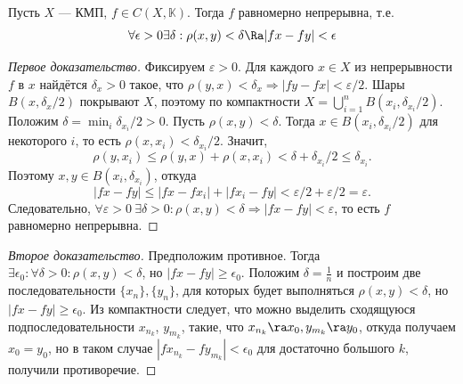 \begin{theorem}[Кантора]
    Пусть \(X\) --- КМП, \(f \in C(X, \mathbb{K})\). Тогда \(f\) равномерно непрерывна, т.е. 
    \[\forall \epsilon > 0 \exists \delta: \rho(x, y) < \delta \Ra |fx - fy| < \epsilon\]
\end{theorem}
\begin{proof}[Первое доказательство]
Фиксируем \(\varepsilon>0\). Для каждого \(x\in X\) из непрерывности \(f\) в \(x\) найдётся \(\delta_x>0\) такое, что \(\rho(y,x)<\delta_x\Rightarrow |fy-fx|<\varepsilon/2\). Шары \(B(x,\delta_x/2)\) покрывают \(X\), поэтому по компактности \(X=\bigcup_{i=1}^n B(x_i,\delta_{x_i}/2)\). Положим \(\delta=\min_i \delta_{x_i}/2>0\). Пусть \(\rho(x,y)<\delta\). Тогда \(x\in B(x_i,\delta_{x_i}/2)\) для некоторого \(i\), то есть \(\rho(x,x_i)<\delta_{x_i}/2\). Значит,
\[
\rho(y,x_i)\le \rho(y,x)+\rho(x,x_i)<\delta+\delta_{x_i}/2\le \delta_{x_i}.
\]
Поэтому \(x,y\in B(x_i,\delta_{x_i})\), откуда
\[
|fx-fy|\le |fx-fx_i|+|fx_i-fy|<\varepsilon/2+\varepsilon/2=\varepsilon.
\]
Следовательно, \(\forall\varepsilon>0\ \exists\delta>0:\rho(x,y)<\delta\Rightarrow |fx-fy|<\varepsilon\), то есть \(f\) равномерно непрерывна.
\end{proof}
\begin{proof}[Второе доказательство]
    Предположим противное. Тогда \(\exists \epsilon_0: \forall \delta > 0: \rho(x, y) < \delta\), но \(|fx - fy| \ge \epsilon_0\). Положим \(\delta = \frac{1}{n}\) и построим две последовательности \(\{x_n\}, \{y_n\}\), для которых будет выполняться \(\rho(x, y) < \delta\), но \(|fx - fy| \ge \epsilon_0\). Из компактности следует, что можно выделить сходящуюся подпоследовательности \(x_{n_k}\), \(y_{m_k}\), такие, что \(x_{n_k} \ra x_0, y_{m_k} \ra y_0\), откуда получаем \(x_0 = y_0\), но в таком случае \(|fx_{n_k} - fy_{m_k}| < \epsilon_0\) для достаточно большого \(k\), получили противоречие.
\end{proof}


